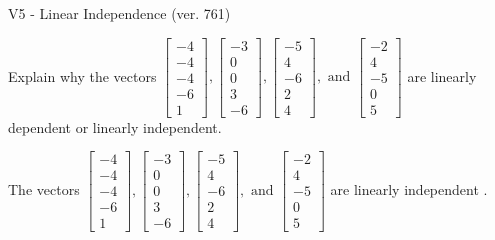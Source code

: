 \begin{exercise}
  \begin{exerciseTitle}V5 - Linear Independence (ver. 761)\end{exerciseTitle}
  \begin{exerciseStatement}
    Explain why the vectors \(\left[\begin{array}{r}
-4 \\
-4 \\
-4 \\
-6 \\
1
\end{array}\right] , \left[\begin{array}{r}
-3 \\
0 \\
0 \\
3 \\
-6
\end{array}\right] , \left[\begin{array}{r}
-5 \\
4 \\
-6 \\
2 \\
4
\end{array}\right] , \text{ and } \left[\begin{array}{r}
-2 \\
4 \\
-5 \\
0 \\
5
\end{array}\right]\) are linearly dependent or linearly independent.	


  \end{exerciseStatement}
  \begin{exerciseAnswer}
   The vectors \(\left[\begin{array}{r}
-4 \\
-4 \\
-4 \\
-6 \\
1
\end{array}\right] , \left[\begin{array}{r}
-3 \\
0 \\
0 \\
3 \\
-6
\end{array}\right] , \left[\begin{array}{r}
-5 \\
4 \\
-6 \\
2 \\
4
\end{array}\right] , \text{ and } \left[\begin{array}{r}
-2 \\
4 \\
-5 \\
0 \\
5
\end{array}\right]\) are 
  	 linearly independent  .
  


  \end{exerciseAnswer}
\end{exercise}